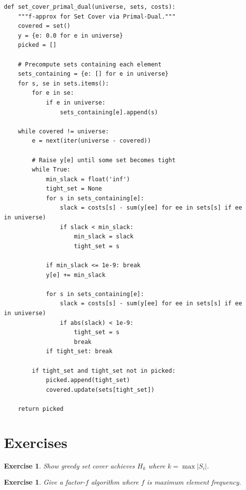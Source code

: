 \documentclass[11pt,oneside]{book}
\newtheorem{exercise}[theorem]{Exercise}
\begin{document}
\begin{lstlisting}[style=python, caption=Primal-Dual Set Cover (f-approx)]
def set_cover_primal_dual(universe, sets, costs):
    """f-approx for Set Cover via Primal-Dual."""
    covered = set()
    y = {e: 0.0 for e in universe}
    picked = []
    
    # Precompute sets containing each element
    sets_containing = {e: [] for e in universe}
    for s, se in sets.items():
        for e in se:
            if e in universe:
                sets_containing[e].append(s)
    
    while covered != universe:
        e = next(iter(universe - covered))
        
        # Raise y[e] until some set becomes tight
        while True:
            min_slack = float('inf')
            tight_set = None
            for s in sets_containing[e]:
                slack = costs[s] - sum(y[ee] for ee in sets[s] if ee in universe)
                if slack < min_slack:
                    min_slack = slack
                    tight_set = s
            
            if min_slack <= 1e-9: break
            y[e] += min_slack
            
            for s in sets_containing[e]:
                slack = costs[s] - sum(y[ee] for ee in sets[s] if ee in universe)
                if abs(slack) < 1e-9:
                    tight_set = s
                    break
            if tight_set: break
        
        if tight_set and tight_set not in picked:
            picked.append(tight_set)
            covered.update(sets[tight_set])
    
    return picked
\end{lstlisting}

\section{Exercises}
\begin{exercise}
Show greedy set cover achieves $H_k$ where $k = \max |S_i|$.
\end{exercise}
\begin{exercise}
Give a factor-$f$ algorithm where $f$ is maximum element frequency.
\end{exercise}

\setcounter{chapter}{13}
\end{document}
